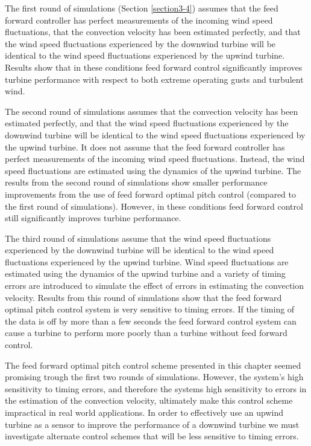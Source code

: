 The first round of simulations (Section \ref{section3-4}) assumes that the feed forward controller has perfect measurements of the incoming wind speed fluctuations, that the convection velocity has been estimated perfectly, and that the wind speed fluctuations experienced by the downwind turbine will be identical to the wind speed fluctuations experienced by the upwind turbine. Results show that in these conditions feed forward control significantly improves turbine performance with respect to both extreme operating gusts and turbulent wind.

The second round of simulations assumes that the convection velocity has been estimated perfectly, and that the wind speed fluctuations experienced by the downwind turbine will be identical to the wind speed fluctuations experienced by the upwind turbine. It does not assume that the feed forward controller has perfect measurements of the incoming wind speed fluctuations. Instead, the wind speed fluctuations are estimated using the dynamics of the upwind turbine. The results from the second round of simulations show smaller performance improvements from the use of feed forward optimal pitch control (compared to the first round of simulations). However, in these conditions feed forward control still significantly improves turbine performance.

The third round of simulations assume that the wind speed fluctuations experienced by the downwind turbine will be identical to the wind speed fluctuations experienced by the upwind turbine. Wind speed fluctuations are estimated using the dynamics of the upwind turbine and a variety of timing errors are introduced to simulate the effect of errors in estimating the convection velocity. Results from this round of simulations show that the feed forward optimal pitch control system is very sensitive to timing errors. If the timing of the data is off by more than a few seconds the feed forward control system can cause a turbine to perform more poorly than a turbine without feed forward control.

The feed forward optimal pitch control scheme presented in this chapter seemed promising trough the first two rounds of simulations. However, the system's high sensitivity to timing errors, and therefore the systems high sensitivity to errors in the estimation of the convection velocity, ultimately make this control scheme impractical in real world applications. In order to effectively use an upwind turbine as a sensor to improve the performance of a downwind turbine we must investigate alternate control schemes that will be less sensitive to timing errors.
